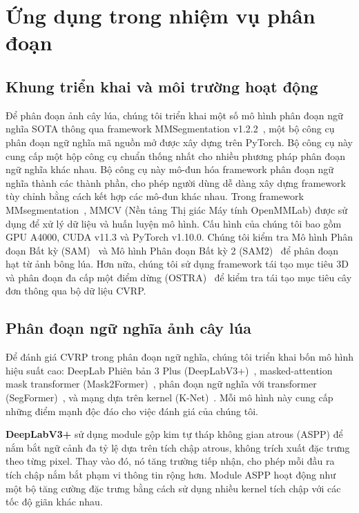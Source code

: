 \documentclass[12pt, a4paper]{article}
\begin{document}
\section{Ứng dụng trong nhiệm vụ phân đoạn}

\subsection{Khung triển khai và môi trường hoạt động}

Để phân đoạn ảnh cây lúa, chúng tôi triển khai một số mô hình phân đoạn ngữ nghĩa SOTA thông
qua framework MMSegmentation v1.2.2~\cite{mmseg2020}, một bộ công cụ phân đoạn ngữ nghĩa mã
nguồn mở được xây dựng trên PyTorch. Bộ công cụ này cung cấp một hộp công cụ chuẩn thống
nhất cho nhiều phương pháp phân đoạn ngữ nghĩa khác nhau. Bộ công cụ này mô-đun hóa framework
phân đoạn ngữ nghĩa thành các thành phần, cho phép người dùng dễ dàng xây dựng framework tùy
chỉnh bằng cách kết hợp các mô-đun khác nhau. Trong framework MMsegmentation~\cite{mmseg2020},
MMCV (Nền tảng Thị giác Máy tính OpenMMLab) được sử dụng để xử lý dữ liệu và huấn luyện mô
hình. Cấu hình của chúng tôi bao gồm GPU A4000, CUDA v11.3 và PyTorch v1.10.0. Chúng tôi
kiểm tra Mô hình Phân đoạn Bất kỳ (SAM)~\cite{kirillov2023} và Mô hình Phân đoạn Bất kỳ 2
(SAM2)~\cite{ravi2024} để phân đoạn hạt từ ảnh bông lúa. Hơn nữa, chúng tôi sử dụng framework
tái tạo mục tiêu 3D và phân đoạn đa cấp một điểm dừng (OSTRA)~\cite{xu2023} để kiểm tra tái
tạo mục tiêu cây đơn thông qua bộ dữ liệu CVRP.

\subsection{Phân đoạn ngữ nghĩa ảnh cây lúa}

Để đánh giá CVRP trong phân đoạn ngữ nghĩa, chúng tôi triển khai bốn mô hình hiệu suất cao:
DeepLab Phiên bản 3 Plus (DeepLabV3+)~\cite{chen2018}, masked-attention mask transformer
(Mask2Former)~\cite{cheng2022}, phân đoạn ngữ nghĩa với transformer (SegFormer)~\cite{xie2021},
và mạng dựa trên kernel (K-Net)~\cite{zhang2021}. Mỗi mô hình này cung cấp những điểm mạnh
độc đáo cho việc đánh giá của chúng tôi.

\textbf{DeepLabV3+} sử dụng module gộp kim tự tháp không gian atrous (ASPP) để nắm bắt ngữ
cảnh đa tỷ lệ dựa trên tích chập atrous, không trích xuất đặc trưng theo từng pixel. Thay
vào đó, nó tăng trường tiếp nhận, cho phép mỗi đầu ra tích chập nắm bắt phạm vi thông tin
rộng hơn. Module ASPP hoạt động như một bộ tăng cường đặc trưng bằng cách sử dụng nhiều
kernel tích chập với các tốc độ giãn khác nhau.
\end{document}
